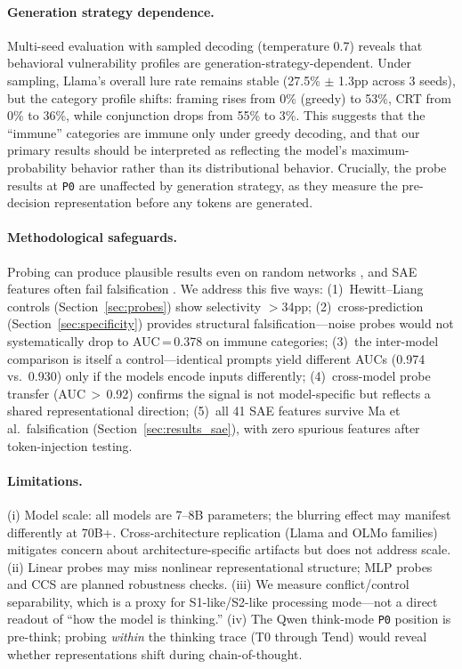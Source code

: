 \documentclass[accepted]{article}
\newcommand{\sone}{S1-like}
\newcommand{\stwo}{S2-like}
\newcommand{\pzero}{\texttt{P0}}
\begin{document}
\paragraph{Generation strategy dependence.}
Multi-seed evaluation with sampled decoding (temperature 0.7) reveals that
behavioral vulnerability profiles are generation-strategy-dependent.  Under
sampling, Llama's overall lure rate remains stable (27.5\% $\pm$ 1.3pp across
3 seeds), but the category profile shifts: framing rises from 0\% (greedy) to
53\%, CRT from 0\% to 36\%, while conjunction drops from 55\% to 3\%.  This
suggests that the ``immune'' categories are immune only under greedy decoding,
and that our primary results should be interpreted as reflecting the model's
maximum-probability behavior rather than its distributional behavior.
Crucially, the probe results at \pzero{} are unaffected by generation strategy,
as they measure the pre-decision representation before any tokens are generated.

\paragraph{Methodological safeguards.}
Probing can produce plausible results even on random networks
\citep{meloux2025dead}, and SAE features often fail falsification
\citep{sanitychecks2026}.  We address this five ways: (1)~Hewitt--Liang
controls (Section~\ref{sec:probes}) show selectivity $>$34pp;
(2)~cross-prediction (Section~\ref{sec:specificity}) provides structural
falsification---noise probes would not systematically drop to
AUC\,=\,0.378 on immune categories; (3)~the inter-model comparison is
itself a control---identical prompts yield different AUCs (0.974
vs.\ 0.930) only if the models encode inputs differently;
(4)~cross-model probe transfer (AUC\,$>$\,0.92) confirms the signal is
not model-specific but reflects a shared representational direction;
(5)~all 41 SAE features survive Ma et al.\ falsification
(Section~\ref{sec:results_sae}), with zero spurious features after
token-injection testing.

\paragraph{Limitations.}
(i) Model scale: all models are 7--8B parameters; the blurring effect
may manifest differently at 70B+.  Cross-architecture replication
(Llama and OLMo families) mitigates concern about architecture-specific
artifacts but does not address scale.
(ii) Linear probes may miss nonlinear representational structure; MLP
probes and CCS \citep{burns2022discovering} are planned robustness checks.
(iii) We measure conflict/control separability, which is a proxy for
\sone{}/\stwo{} processing mode---not a direct readout of ``how the model
is thinking.''
(iv) The Qwen think-mode \pzero{} position is pre-think; probing
\emph{within} the thinking trace (T0 through Tend) would reveal whether
representations shift during chain-of-thought.
\end{document}
